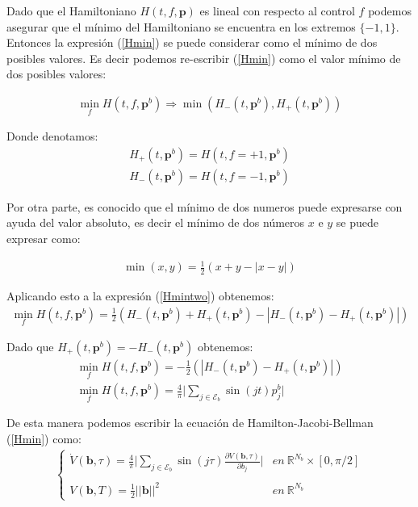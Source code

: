 Dado que el Hamiltoniano $H(t,f,\bm{p})$ es lineal con respecto al control $f$ podemos asegurar que el mínimo del Hamiltoniano se encuentra en los extremos $\{-1,1\}$. Entonces la expresión (\ref{Hmin}) se puede considerar como el mínimo de dos posibles valores. Es decir podemos re-escribir (\ref{Hmin}) como el valor mínimo de dos posibles valores:

\begin{gather}\label{Hmintwo}
    \min_f H(t,f,\bm{p}^b) \Rightarrow \min (H_{-}(t,\bm{p}^b),H_{+}(t,\bm{p}^b))
\end{gather}

Donde denotamos:
\begin{gather}
    H_{+}(t,\bm{p}^b) = H(t,f=+1,\bm{p}^b) \\
    H_{-}(t,\bm{p}^b) = H(t,f=-1,\bm{p}^b)
\end{gather}

Por otra parte, es conocido que el mínimo de dos numeros puede expresarse con ayuda del valor absoluto, es decir el mínimo de dos números $x$ e $y$ se puede expresar como:

\begin{gather}
    \min (x,y) = \frac{1}{2} (x+y - |x-y|)
\end{gather}

Aplicando esto a la expresión (\ref{Hmintwo}) obtenemos:
\begin{gather}
    \min_f H(t,f,\bm{p}^b) = \frac{1}{2}(
        H_{-}(t,\bm{p}^b) + H_{+}(t,\bm{p}^b) -
         |H_{-}(t,\bm{p}^b) - H_{+}(t,\bm{p}^b)|)
\end{gather}

Dado que $H_{+}(t,\bm{p}^b) = -H_{-}(t,\bm{p}^b)$ obtenemos:
\begin{gather}
    \min_f H(t,f,\bm{p}^b) = -\frac{1}{2}(
         |H_{-}(t,\bm{p}^b) - H_{+}(t,\bm{p}^b)|) \\
    \min_f H(t,f,\bm{p}^b) =   \frac{4}{\pi} \Bigg| \sum_{j \in \mathcal{E}_b} \sin(jt) p_ j^b \Bigg|
\end{gather}

De esta manera podemos escribir la ecuación de Hamilton-Jacobi-Bellman (\ref{Hmin}) como:
\begin{gather}
    \begin{cases}
        \displaystyle \dot{V}(\bm{b},\tau) = \frac{4}{\pi} \Big| \sum_{j \in \mathcal{E}_b} \sin(j\tau) \frac{\partial V(\bm{b},\tau)}{\partial b_j} \Big| & en \ \mathbb{R}^{N_b} \times [0,\pi/2]  \\ \\
        V(\bm{b},T) = \frac{1}{2} ||\bm{b}||^2 & en \ \mathbb{R}^{N_b}
    \end{cases}
\end{gather}


